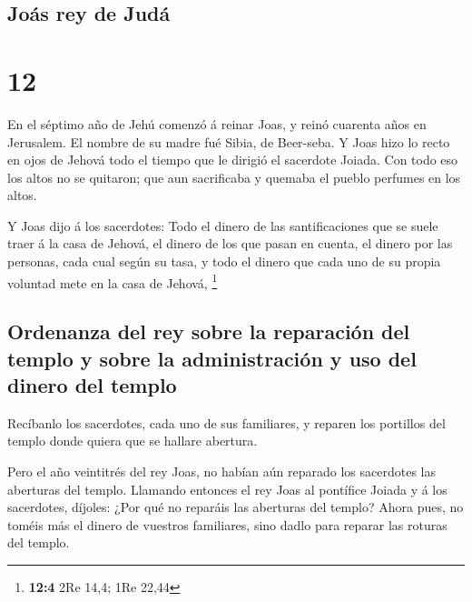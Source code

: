 \hypertarget{jouxe1s-rey-de-juduxe1}{%
\subsection{Joás rey de Judá}\label{jouxe1s-rey-de-juduxe1}}

\hypertarget{section-11}{%
\section{12}\label{section-11}}

 En el séptimo año de Jehú comenzó á reinar Joas, y reinó
cuarenta años en Jerusalem. El nombre de su madre fué Sibia, de
Beer-seba.  Y Joas hizo lo recto en ojos de Jehová todo el
tiempo que le dirigió el sacerdote Joiada.  Con todo eso
los altos no se quitaron; que aun sacrificaba y quemaba el pueblo
perfumes en los altos.

 Y Joas dijo á los sacerdotes: Todo el dinero de las
santificaciones que se suele traer á la casa de Jehová, el dinero de los
que pasan en cuenta, el dinero por las personas, cada cual según su
tasa, y todo el dinero que cada uno de su propia voluntad mete en la
casa de Jehová, \footnote{\textbf{12:4} 2Re 14,4; 1Re 22,44}

\hypertarget{ordenanza-del-rey-sobre-la-reparaciuxf3n-del-templo-y-sobre-la-administraciuxf3n-y-uso-del-dinero-del-templo}{%
\subsection{Ordenanza del rey sobre la reparación del templo y sobre la
administración y uso del dinero del
templo}\label{ordenanza-del-rey-sobre-la-reparaciuxf3n-del-templo-y-sobre-la-administraciuxf3n-y-uso-del-dinero-del-templo}}

 Recíbanlo los sacerdotes, cada uno de sus familiares, y
reparen los portillos del templo donde quiera que se hallare abertura.

 Pero el año veintitrés del rey Joas, no habían aún
reparado los sacerdotes las aberturas del templo. 
Llamando entonces el rey Joas al pontífice Joiada y á los sacerdotes,
díjoles: ¿Por qué no reparáis las aberturas del templo? Ahora pues, no
toméis más el dinero de vuestros familiares, sino dadlo para reparar las
roturas del templo.

